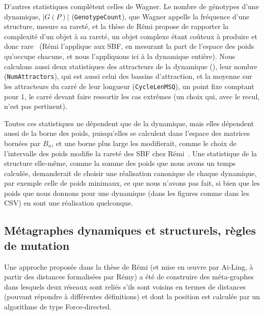 \documentclass[12pt, a4paper]{article}
\begin{document}
D'autres statistiques complètent celles de Wagner.
Le nombre de génotypes d'une dynamique, $|G(P)|$ (\texttt{GenotypeCount}), que Wagner appelle la fréquence d'une structure, mesure sa rareté, et la thèse de Rémi propose de rapporter la complexité d'un objet à sa rareté, un objet complexe étant coûteux à produire et donc rare~\cite{segretain2023} (Rémi l'applique aux SBF, en mesurant la part de l'espace des poids qu'occupe chacune, et nous l'appliquons ici à la dynamique entière).
Nous calculons aussi deux statistiques des attracteurs de la dynamique (), leur nombre (\texttt{NumAttractors}), qui est aussi celui des bassins d'attraction, et la moyenne sur les attracteurs du carré de leur longueur (\texttt{CycleLenMSQ}), un point fixe comptant pour 1, le carré devant faire ressortir les cas extrêmes (un choix qui, avec le recul, n'est pas pertinent).

Toutes ces statistiques ne dépendent que de la dynamique, mais elles dépendent aussi de la borne des poids, puisqu'elles se calculent dans l'espace des matrices bornées par $B_n$, et une borne plus large les modifierait, comme le choix de l'intervalle des poids modifie la rareté des SBF chez Rémi~\cite{segretain2023}.
Une statistique de la structure elle-même, comme la somme des poids que nous avons un temps calculée, demanderait de choisir une réalisation canonique de chaque dynamique, par exemple celle de poids minimaux, ce que nous n'avons pas fait, si bien que les poids que nous donnons pour une dynamique (dans les figures comme dans les CSV) en sont une réalisation quelconque.


\subsection{Métagraphes dynamiques et structurels, règles de mutation}
\label{sec:metagraphes}

Une approche proposée dans la thèse de Rémi (et mise en œuvre par Ai-Ling, à partir des distances formalisées par Rémy) a été de construire des méta-graphes dans lesquels deux réseaux sont reliés s'ils sont voisins en termes de distances (pouvant répondre à différentes définitions) et dont la position est calculée par un algorithme de type Force-directed.
\end{document}
